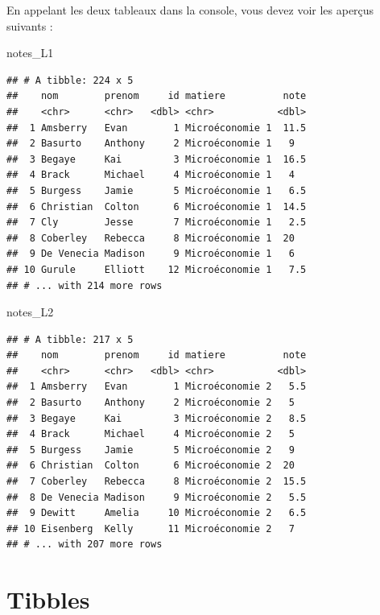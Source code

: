 \documentclass[
  11pt,
]{book}
\newenvironment{Shaded}{\begin{snugshade}}{\end{snugshade}}
\newcommand{\NormalTok}[1]{#1}
\numberwithin{equation}{section}
\numberwithin{countremarque}{section}
\begin{document}
En appelant les deux tableaux dans la console, vous devez voir les aperçus suivants :

\begin{Shaded}
\begin{Highlighting}[]
\NormalTok{notes\_L1}
\end{Highlighting}
\end{Shaded}

\begin{lstlisting}
## # A tibble: 224 x 5
##    nom        prenom     id matiere          note
##    <chr>      <chr>   <dbl> <chr>           <dbl>
##  1 Amsberry   Evan        1 Microéconomie 1  11.5
##  2 Basurto    Anthony     2 Microéconomie 1   9  
##  3 Begaye     Kai         3 Microéconomie 1  16.5
##  4 Brack      Michael     4 Microéconomie 1   4  
##  5 Burgess    Jamie       5 Microéconomie 1   6.5
##  6 Christian  Colton      6 Microéconomie 1  14.5
##  7 Cly        Jesse       7 Microéconomie 1   2.5
##  8 Coberley   Rebecca     8 Microéconomie 1  20  
##  9 De Venecia Madison     9 Microéconomie 1   6  
## 10 Gurule     Elliott    12 Microéconomie 1   7.5
## # ... with 214 more rows
\end{lstlisting}

\begin{Shaded}
\begin{Highlighting}[]
\NormalTok{notes\_L2}
\end{Highlighting}
\end{Shaded}

\begin{lstlisting}
## # A tibble: 217 x 5
##    nom        prenom     id matiere          note
##    <chr>      <chr>   <dbl> <chr>           <dbl>
##  1 Amsberry   Evan        1 Microéconomie 2   5.5
##  2 Basurto    Anthony     2 Microéconomie 2   5  
##  3 Begaye     Kai         3 Microéconomie 2   8.5
##  4 Brack      Michael     4 Microéconomie 2   5  
##  5 Burgess    Jamie       5 Microéconomie 2   9  
##  6 Christian  Colton      6 Microéconomie 2  20  
##  7 Coberley   Rebecca     8 Microéconomie 2  15.5
##  8 De Venecia Madison     9 Microéconomie 2   5.5
##  9 Dewitt     Amelia     10 Microéconomie 2   6.5
## 10 Eisenberg  Kelly      11 Microéconomie 2   7  
## # ... with 207 more rows
\end{lstlisting}

\hypertarget{tibbles}{%
\section{Tibbles}\label{tibbles}}
\end{document}

